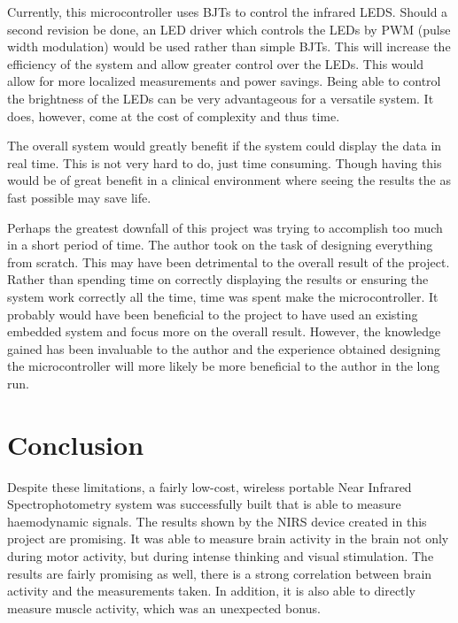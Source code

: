Currently, this microcontroller uses BJTs to control the infrared LEDS. Should a second revision be done, an LED driver which controls the LEDs by PWM (pulse width modulation) would be used rather than simple BJTs. This will increase the efficiency of the system and allow greater control over the LEDs. This would allow for more localized measurements and power savings. Being able to control the brightness of the LEDs can be very advantageous for a versatile system. It does, however, come at the cost of complexity and thus time.

The overall system would greatly benefit if the system could display the data in real time. This is not very hard to do, just time consuming. Though having this would be of great benefit in a clinical environment where seeing the results the as fast possible may save life. 

Perhaps the greatest downfall of this project was trying to accomplish too much in a short period of time. The author took on the task of designing everything from scratch. This may have been detrimental to the overall result of the project. Rather than spending time on correctly displaying the results or ensuring the system work correctly all the time, time was spent make the microcontroller. It probably would have been beneficial to the project to have used an existing embedded system and focus more on the overall result. However, the knowledge gained has been invaluable to the author and the experience obtained designing the microcontroller will more likely be more beneficial to the author in the long run.

\chapter {Conclusion}

Despite these limitations, a fairly low-cost, wireless portable Near Infrared Spectrophotometry system was successfully built that is able to measure haemodynamic signals. The results shown by the NIRS device created in this project are promising. It was able to measure brain activity in the brain not only during motor activity, but during intense thinking and visual stimulation. The results are fairly promising as well, there is a strong correlation between brain activity and the measurements taken. In addition, it is also able to directly measure muscle activity, which was an unexpected bonus. 

